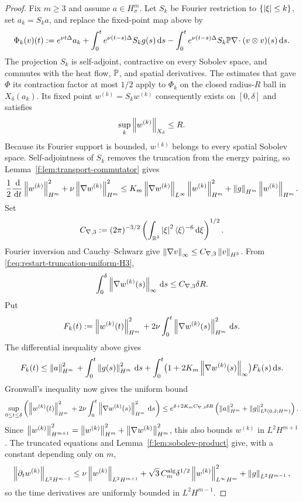 \begin{proof}
Fix \(m\ge3\) and assume \(a\in H^m_\sigma\).  Let \(S_k\) be Fourier
restriction to \(\{\left|\xi\right|\le k\}\), set \(a_k=S_ka\), and replace the
fixed-point map above by
\[
 \Phi_k(v)(t):=e^{\nu t\Delta}a_k
 +\int_0^te^{\nu(t-s)\Delta}S_kg(s)\,\mathrm d s
 -\int_0^te^{\nu(t-s)\Delta}S_k\mathbb P\nabla\!\cdot
   (v\otimes v)(s)\,\mathrm d s.
\]
The projection \(S_k\) is self-adjoint, contractive on every Sobolev space,
and commutes with the heat flow, \(\mathbb P\), and spatial derivatives.  The estimates that gave \(\Phi\) its contraction factor at most \(1/2\) apply to
\(\Phi_k\) on the closed radius-\(R\) ball in \(X_\delta(a_k)\).  Its fixed point
\(w^{(k)}=S_kw^{(k)}\) consequently exists on \([0,\delta]\) and satisfies
\begin{equation}
 \sup_k\left\lVert w^{(k)}\right\rVert_{X_\delta}\le R.
 \label{f:eq:restart-truncation-uniform-H3}
\end{equation}
Because its Fourier support is bounded, \(w^{(k)}\) belongs to every spatial
Sobolev space.  Self-adjointness of \(S_k\) removes the truncation from the energy
pairing, so Lemma~\ref{f:lem:transport-commutator} gives
\[
 \frac12\frac{\,\mathrm d}{\,\mathrm d t}\left\lVert w^{(k)}\right\rVert_{H^m}^2
 +\nu\left\lVert \nabla w^{(k)}\right\rVert_{H^m}^2
 \le K_m\left\lVert \nabla w^{(k)}\right\rVert_{L^\infty}
       \left\lVert w^{(k)}\right\rVert_{H^m}^2
 +\left\lVert g\right\rVert_{H^m}\left\lVert w^{(k)}\right\rVert_{H^m}.
\]
Set
\[
 C_{\nabla,3}:=(2\pi)^{-3/2}
 \left(\int_{\mathbb R^3}\left|\xi\right|^2\langle\xi\rangle^{-6}\,\mathrm d\xi\right)^{1/2}.
\]
Fourier inversion and Cauchy--Schwarz give
\(\left\lVert \nabla v\right\rVert_\infty\le C_{\nabla,3}\left\lVert v\right\rVert_{H^3}\).  From
\eqref{f:eq:restart-truncation-uniform-H3},
\[
 \int_0^\delta\left\lVert \nabla w^{(k)}(s)\right\rVert_\infty\,\mathrm d s
 \le C_{\nabla,3}\delta R.
\]
Put
\[
 F_k(t):=\left\lVert w^{(k)}(t)\right\rVert_{H^m}^2
 {}+2\nu\int_0^t\left\lVert \nabla w^{(k)}(s)\right\rVert_{H^m}^2\,\mathrm d s.
\]
The differential inequality above gives
\[
 F_k(t)\le\left\lVert a\right\rVert_{H^m}^2
 {}+\int_0^t\left\lVert g(s)\right\rVert_{H^m}^2\,\mathrm d s
 {}+\int_0^t\bigl(1+2K_m\left\lVert \nabla w^{(k)}(s)\right\rVert_\infty\bigr)
 F_k(s)\,\mathrm d s.
\]
Gronwall's inequality now gives the uniform bound
\begin{equation}
 \sup_{0\le t\le\delta}\left(
 \left\lVert w^{(k)}(t)\right\rVert_{H^m}^2
{}+2\nu\int_0^t\left\lVert \nabla w^{(k)}(s)\right\rVert_{H^m}^2\,\mathrm d s
 \right)
 \le e^{\delta+2K_mC_{\nabla,3}\delta R}
 \left(\left\lVert a\right\rVert_{H^m}^2+\left\lVert g\right\rVert_{L^2(0,\delta;H^m)}^2\right).
 \label{f:eq:restart-truncation-uniform-Hm}
\end{equation}
Since
\(
 \left\lVert w^{(k)}\right\rVert_{H^{m+1}}^2
 =\left\lVert w^{(k)}\right\rVert_{H^m}^2+\left\lVert \nabla w^{(k)}\right\rVert_{H^m}^2
\), this also bounds \(w^{(k)}\) in \(L^2H^{m+1}\).  The truncated equations
and Lemma~\ref{f:lem:sobolev-product} give, with a constant depending only on
\(m\),
\[
 \left\lVert \partial_tw^{(k)}\right\rVert_{L^2H^{m-1}}
 \le \nu\left\lVert w^{(k)}\right\rVert_{L^2H^{m+1}}
 +\sqrt3\,C_m^{\rm alg}\delta^{1/2}
   \left\lVert w^{(k)}\right\rVert_{L^\infty H^m}^2
  +\left\lVert g\right\rVert_{L^2H^{m-1}},
\]
so the time derivatives are uniformly bounded in \(L^2H^{m-1}\).


\end{proof}
